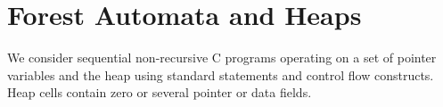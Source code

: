 \section{Forest Automata and Heaps}


We consider sequential non-recursive C programs operating on a set of pointer
variables and the heap using standard statements and control flow constructs.
Heap cells contain zero or several pointer or data fields.

%

